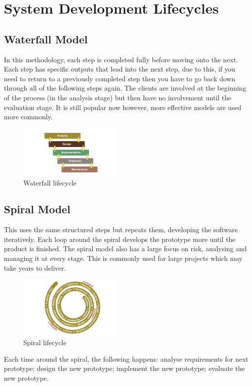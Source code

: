\documentclass[a4paper,11pt, twocolumn]{article}
\begin{document}
\section{System Development Lifecycles}
\subsection{Waterfall Model}
In this methodology, each step is completed fully before moving onto the next. Each step has specific outputs that lead into the next step, due to this, if you need to return to a previously completed step then you have to go back down through all of the following steps again. The clients are involved at the beginning of the process (in the analysis stage) but then have no involvement until the evaluation stage. It is still popular now however, more effective models are used more commonly.
\begin{figure}[H]
    \centering
    \includegraphics[width=0.45\textwidth]{images/waterfall.png}
    \caption{Waterfall lifecycle}
    \label{fig:waterfall}
\end{figure}
\subsection{Spiral Model}
This uses the same structured steps but repeats them, developing the software iteratively. Each loop around the spiral develops the prototype more until the product is finished. The spiral model also has a large focus on risk, analysing and managing it at every stage. This is commonly used for large projects which may take years to deliver. 
\begin{figure}[H]
    \centering
    \includegraphics[width=0.45\textwidth]{images/spiral.png}
    \caption{Spiral lifecycle}
    \label{fig:spiral}
\end{figure}
\noindent Each time around the spiral, the following happens: analyse requirements for next prototype; design the new prototype; implement the new prototype; evaluate the new prototype. 
\end{document}
